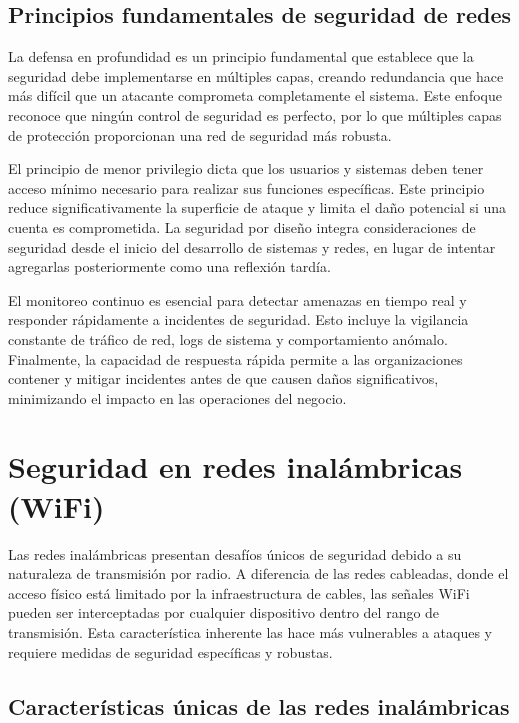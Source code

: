 \subsection{Principios fundamentales de seguridad de redes}

La defensa en profundidad es un principio fundamental que establece que la seguridad debe implementarse en múltiples capas, creando redundancia que hace más difícil que un atacante comprometa completamente el sistema. Este enfoque reconoce que ningún control de seguridad es perfecto, por lo que múltiples capas de protección proporcionan una red de seguridad más robusta.

El principio de menor privilegio dicta que los usuarios y sistemas deben tener acceso mínimo necesario para realizar sus funciones específicas. Este principio reduce significativamente la superficie de ataque y limita el daño potencial si una cuenta es comprometida. La seguridad por diseño integra consideraciones de seguridad desde el inicio del desarrollo de sistemas y redes, en lugar de intentar agregarlas posteriormente como una reflexión tardía.

El monitoreo continuo es esencial para detectar amenazas en tiempo real y responder rápidamente a incidentes de seguridad. Esto incluye la vigilancia constante de tráfico de red, logs de sistema y comportamiento anómalo. Finalmente, la capacidad de respuesta rápida permite a las organizaciones contener y mitigar incidentes antes de que causen daños significativos, minimizando el impacto en las operaciones del negocio.

\section{Seguridad en redes inalámbricas (WiFi)}

Las redes inalámbricas presentan desafíos únicos de seguridad debido a su naturaleza de transmisión por radio. A diferencia de las redes cableadas, donde el acceso físico está limitado por la infraestructura de cables, las señales WiFi pueden ser interceptadas por cualquier dispositivo dentro del rango de transmisión. Esta característica inherente las hace más vulnerables a ataques y requiere medidas de seguridad específicas y robustas.

\subsection{Características únicas de las redes inalámbricas}

